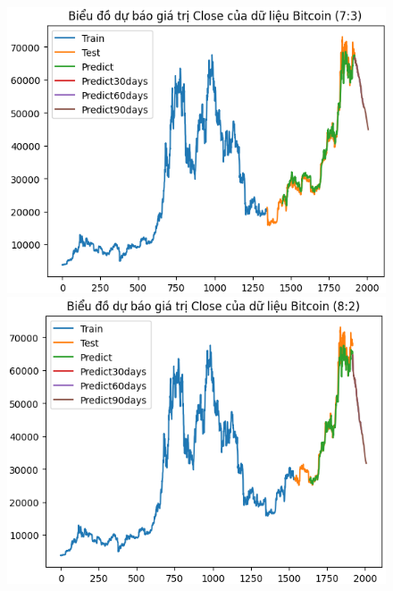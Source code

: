 \documentclass[conference]{IEEEtran}
\begin{document}
	\begin{figure}[H]
		\centering
		\begin{minipage}{0.15\textwidth}
			\centering
			\includegraphics[width=1\textwidth]{Figure/BTC73.png}
		\end{minipage}
		\hfill
		\begin{minipage}{0.15\textwidth}
			\centering
			\includegraphics[width=1\textwidth]{Figure/BTC82.png}
		\end{minipage}
		\hfill
		\begin{minipage}{0.15\textwidth}
			\centering

\end{minipage}
\end{figure}
\end{document}
